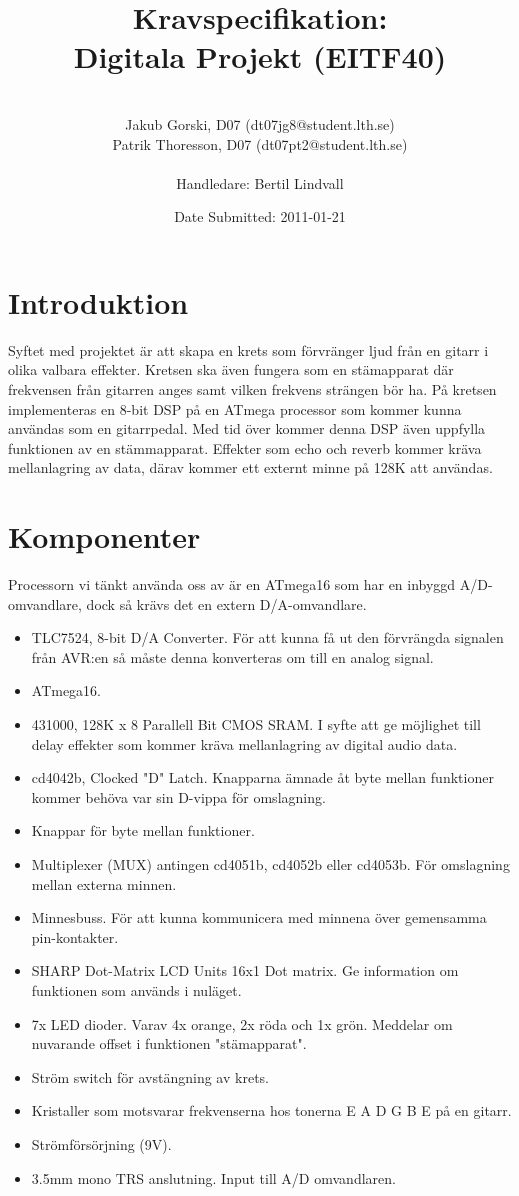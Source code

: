 \documentclass[a4paper]{article}
\title{Kravspecifikation: \\ Digitala Projekt (EITF40)}
\author{\\Jakub Gorski, D07 (dt07jg8@student.lth.se)\\
Patrik Thoresson, D07 (dt07pt2@student.lth.se)\\\\Handledare: Bertil Lindvall}
\date{Date Submitted: 2011-01-21}
\begin{document}
\maketitle
\thispagestyle{empty}
\newpage


\section{Introduktion}
Syftet med projektet är att skapa en krets som förvränger ljud från en gitarr i olika valbara effekter. Kretsen ska även fungera som en stämapparat där frekvensen från gitarren anges samt vilken frekvens strängen bör ha. På kretsen implementeras en 8-bit DSP på en ATmega processor som kommer kunna användas som en gitarrpedal. Med tid över kommer denna DSP även uppfylla funktionen av en stämmapparat. Effekter som echo och reverb kommer kräva mellanlagring av data, därav kommer ett externt minne på 128K att användas.

\section{Komponenter}
Processorn vi tänkt använda oss av är en ATmega16 som har en inbyggd A/D-omvandlare, dock så krävs det en extern D/A-omvandlare.
\begin{itemize}
\item TLC7524, 8-bit D/A Converter. För att kunna få ut den förvrängda signalen från AVR:en så måste denna konverteras om till en analog signal.
\item ATmega16.
\item 431000, 128K x 8 Parallell Bit CMOS SRAM. I syfte att ge möjlighet till delay effekter som kommer kräva mellanlagring av digital audio data.
\item cd4042b, Clocked "D" Latch. Knapparna ämnade åt byte mellan funktioner kommer behöva var sin D-vippa för omslagning.
\item Knappar för byte mellan funktioner.
\item Multiplexer (MUX) antingen cd4051b, cd4052b eller cd4053b. För omslagning mellan externa minnen.
\item Minnesbuss. För att kunna kommunicera med minnena över gemensamma pin-kontakter.
\item SHARP Dot-Matrix LCD Units 16x1 Dot matrix. Ge information om funktionen som används i nuläget.
\item 7x LED dioder. Varav 4x orange, 2x röda och 1x grön. Meddelar om nuvarande offset i funktionen "stämapparat".
\item Ström switch för avstängning av krets.
\item Kristaller som motsvarar frekvenserna hos tonerna E A D G B E på en gitarr.
\item Strömförsörjning (9V).
\item 3.5mm mono TRS anslutning. Input till A/D omvandlaren.

\end{itemize}
\end{document}

